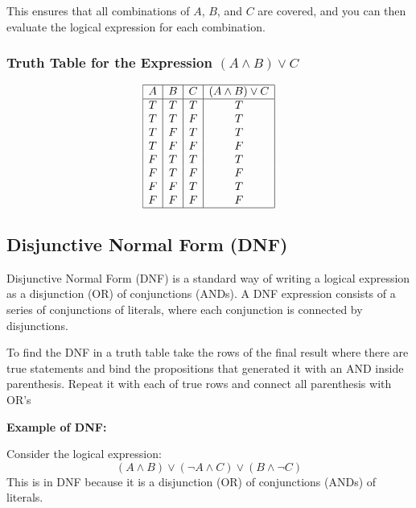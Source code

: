 This ensures that all combinations of \(A\), \(B\), and \(C\) are covered, and you can then evaluate the logical expression for each combination.

\subsubsection{Truth Table for the Expression \( (A \land B) \lor C \)}

\[
	\begin{array}{|c|c|c|c|}
		\hline
		A & B & C & (A \land B) \lor C \\
		\hline
		T & T & T & T                  \\
		T & T & F & T                  \\
		T & F & T & T                  \\
		T & F & F & F                  \\
		F & T & T & T                  \\
		F & T & F & F                  \\
		F & F & T & T                  \\
		F & F & F & F                  \\
		\hline
	\end{array}
\]

\subsection{Disjunctive Normal Form (DNF)}

Disjunctive Normal Form (DNF) is a standard way of writing a logical expression as a disjunction
(OR) of conjunctions (ANDs). A DNF expression consists of a series of
conjunctions of literals, where each conjunction is connected by disjunctions.
\vspace{\baselineskip}

To find the DNF in a truth table take the rows of the final result where there are
true statements and bind the propositions that generated it with an AND inside parenthesis.
Repeat it with each of true rows and connect all parenthesis with OR's
\vspace{\baselineskip}

\textbf{Example of DNF:}
\vspace{\baselineskip}

Consider the logical expression:
\[
	(A \land B) \lor (\neg A \land C) \lor (B \land \neg C)
\]
This is in DNF because it is a disjunction (OR) of conjunctions (ANDs) of literals.

